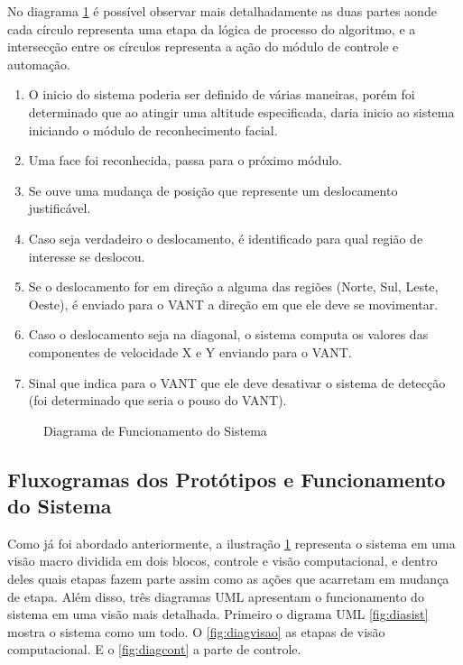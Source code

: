 No diagrama \ref{fig:pross} é possível observar mais detalhadamente as duas partes aonde cada círculo representa uma etapa da lógica de processo do algoritmo, e a intersecção entre os círculos representa a ação do módulo de controle e automação.
\begin{enumerate}
	\item O inicio do sistema poderia ser definido de várias maneiras, porém foi determinado que ao atingir uma altitude especificada, daria inicio ao sistema iniciando o módulo de reconhecimento facial.
	\item Uma face foi reconhecida, passa para o próximo módulo.
	\item Se ouve uma mudança de posição que represente um deslocamento justificável.
	\item Caso seja verdadeiro o deslocamento, é identificado para qual região de interesse se deslocou.
	\item Se o deslocamento for em direção a alguma das regiões (Norte, Sul, Leste, Oeste), é enviado para o VANT a direção em que ele deve se movimentar.
	\item Caso o deslocamento seja na diagonal, o sistema computa os valores das componentes de velocidade X e Y enviando para o VANT.  
	\item Sinal que indica para o VANT que ele deve desativar o sistema de detecção (foi determinado que seria o pouso do VANT).
\end{enumerate}

\begin{figure}[H]
	\centering	
	\caption{Diagrama de Funcionamento do Sistema}
	\fontsize{9pt}{12pt}\selectfont
	\def\svgwidth{15cm}
	
	\label{fig:pross}
\end{figure}

\subsection{Fluxogramas dos Protótipos e Funcionamento do Sistema}

Como já foi abordado anteriormente, a ilustração \ref{fig:pross} representa o sistema em uma visão macro dividida em dois blocos, controle e visão computacional, e dentro deles quais etapas fazem parte assim como as ações que acarretam em mudança de etapa. Além disso, três diagramas UML apresentam o funcionamento do sistema em uma visão mais detalhada. Primeiro o digrama UML \ref{fig:diasist} mostra o sistema como um todo. O \ref{fig:diagvisao} as etapas de visão computacional.  E o \ref{fig:diagcont} a parte de controle.

